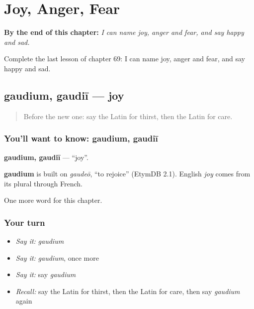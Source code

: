 
\chapter{Joy, Anger, Fear}
\label{ch:la-joy-anger-fear}

\begin{chapteropening}
\textbf{By the end of this chapter:} \emph{I can name joy, anger and fear, and say happy and sad.}

Complete the last lesson of chapter 69: I can name joy, anger and fear, and say happy and sad.
\end{chapteropening}

\section[gaudium, gaudiī]{gaudium, gaudiī — joy}

\label{lesson:LA-C69-gaudium}



\begin{quote}
Before the new one: say the Latin for thirst, then the Latin for care.
\end{quote}

\subsection*{You'll want to know: gaudium, gaudiī}
\textbf{gaudium, gaudiī} — \textquotedblleft{}joy\textquotedblright{}.

\begin{cousinweb}
\textbf{gaudium} is built on \emph{gaudeō}, \textquotedblleft{}to rejoice\textquotedblright{} (EtymDB 2.1). English \emph{joy} comes from its plural through French.
\end{cousinweb}

\begin{grammarlens}[title={What you've built}]
One more word for this chapter.
\end{grammarlens}

\subsection*{Your turn}
\begin{itemize}
\raggedright
  \item \emph{Say it:} \emph{gaudium}
  \item \emph{Say it:} \emph{gaudium}, once more
  \item \emph{Say it:} say \emph{gaudium}
  \item \emph{Recall:} say the Latin for thirst, then the Latin for care, then say \emph{gaudium} again
\end{itemize}

